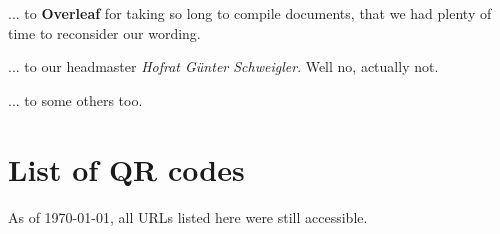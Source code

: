 \documentclass[
	fontsize=10pt, %
	twoside=false, %
	open=any, %
	numbers=noenddot, %
]{kaobook}
\newcommand{\printqrcodes}{%
  \section*{List of QR codes}
  As of \today, all URLs listed here were still accessible.\\[3mm]
  \immediate\closeout\qrfile%
  \pagebreak%
}
\begin{document}
... to \textbf{Overleaf} for taking so long to compile documents, that we had plenty of time to reconsider our wording.

... to our headmaster \textit{Hofrat Günter Schweigler}. Well no, actually not.

... to some others too.

\pagebreak



\printbibliography[heading=bibintoc, title=Bibliography, prenote=bibnote] %




\printglossary[title=Special Terms, toctitle=List of Terms] %

\pagebreak
\printqrcodes
\end{document}
